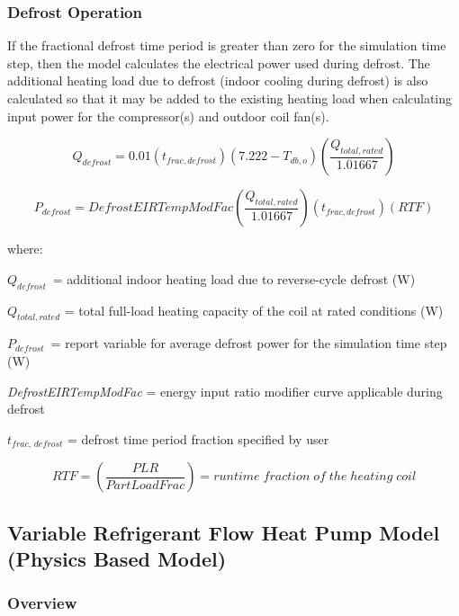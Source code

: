 \subsubsection{Defrost Operation}\label{defrost-operation-201605050925}

If the fractional defrost time period is greater than zero for the simulation time step, then the model calculates the electrical power used during defrost. The additional heating load due to defrost (indoor cooling during defrost) is also calculated so that it may be added to the existing heating load when calculating input power for the compressor(s) and outdoor coil fan(s).

\begin{equation}
  Q_{defrost} = 0.01 \left( t_{frac,defrost} \right) \left( 7.222 - T_{db,o} \right) \left( \frac{Q_{total,rated}}{1.01667} \right)
\end{equation}

\begin{equation}
  P_{defrost} = DefrostEIRTempModFac \left( \frac{Q_{total,rated}}{1.01667} \right) \left( t_{frac,defrost} \right) \left( RTF \right)
\end{equation}

where:

\(Q_{defrost}\) = additional indoor heating load due to reverse-cycle defrost (W)

\(Q_{total,rated}\) = total full-load heating capacity of the coil at rated conditions (W)

\(P_{defrost}\) = report variable for average defrost power for the simulation time step (W)

\emph{DefrostEIRTempModFac} = energy input ratio modifier curve applicable during defrost

\(t_{frac,\,defrost}\) = defrost time period fraction specified by user

\begin{equation}
  RTF = \left(  \frac{PLR}{PartLoadFrac} \right) = runtime\;fraction\;of\;the\;heating\;coil
\end{equation}

\subsection{Variable Refrigerant Flow Heat Pump Model (Physics Based Model)}\label{variable-refrigerant-flow-heat-pump-model-physics-based-model}

\subsubsection{Overview}\label{variable-refrigerant-flow-heat-pump-model-physics-based-model:overview}

